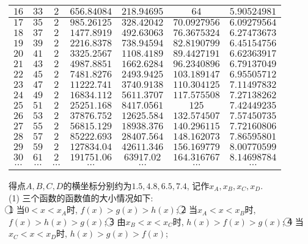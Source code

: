 \documentclass[10pt,a4paper]{article}
\begin{document}
\begin{enumerate}[1.]
\begin{center}
\begin{longtable}{|c|c|c|c|c|c|c|}
        $16$ & $33$ & $2$ & $656.84084$ & $218.94695$ & $64$ & $5.90524981$\\ \hline
        $17$ & $35$ & $2$ & $985.26125$ & $328.42042$ & $70.0927956$ & $6.09279564$\\ \hline
        $18$ & $37$ & $2$ & $1477.8919$ & $492.63063$ & $76.3675324$ & $6.27473673$\\ \hline
        $19$ & $39$ & $2$ & $2216.8378$ & $738.94594$ & $82.8190799$ & $6.45154756$\\ \hline
        $20$ & $41$ & $2$ & $3325.2567$ & $1108.4189$ & $89.4427191$ & $6.62363917$\\ \hline
        $21$ & $43$ & $2$ & $4987.8851$ & $1662.6284$ & $96.2340896$ & $6.79137049$\\ \hline
        $22$ & $45$ & $2$ & $7481.8276$ & $2493.9425$ & $103.189147$ & $6.95505712$\\ \hline
        $23$ & $47$ & $2$ & $11222.741$ & $3740.9138$ & $110.304125$ & $7.11497832$\\ \hline
        $24$ & $49$ & $2$ & $16834.112$ & $5611.3707$ & $117.575508$ & $7.27138262$\\ \hline
        $25$ & $51$ & $2$ & $25251.168$ & $8417.0561$ & $125$ & $7.42449235$\\ \hline
        $26$ & $53$ & $2$ & $37876.752$ & $12625.584$ & $132.574507$ & $7.57450735$\\ \hline
        $27$ & $55$ & $2$ & $56815.129$ & $18938.376$ & $140.296115$ & $7.72160806$\\ \hline
        $28$ & $57$ & $2$ & $85222.693$ & $28407.564$ & $148.162073$ & $7.86595801$\\ \hline
        $29$ & $59$ & $2$ & $127834.04$ & $42611.346$ & $156.169779$ & $8.00770599$\\ \hline
        $30$ & $61$ & $2$ & $191751.06$ & $63917.02$ & $164.316767$ & $8.14698784$\\ \hline
        $\cdots$ & $\cdots$ & $\cdots$ & $\cdots$ & $\cdots$ & $\cdots$ & $\cdots$ \\ \hline
    \end{longtable}
\end{center}
得点$A,B,C,D$的横坐标分别约为$1.5,4.8, 6.5, 7.4$, 记作$x_A,x_B,x_C,x_D$.\\
(1) 三个函数的函数值的大小情况如下:\\
\textcircled{1} 当$0<x<x_A$时, $f(x)>g(x)>h(x)$;
\textcircled{2} 当$x_A<x<x_B$时, $f(x)>h(x)>g(x)$;
\textcircled{3} 由$x_B<x<x_C$时, $h(x)>f(x)>g(x)$;
\textcircled{4} 当$x_C<x<x_D$时, $h(x)>g(x)>f(x)$;

\end{enumerate}
\end{document}
